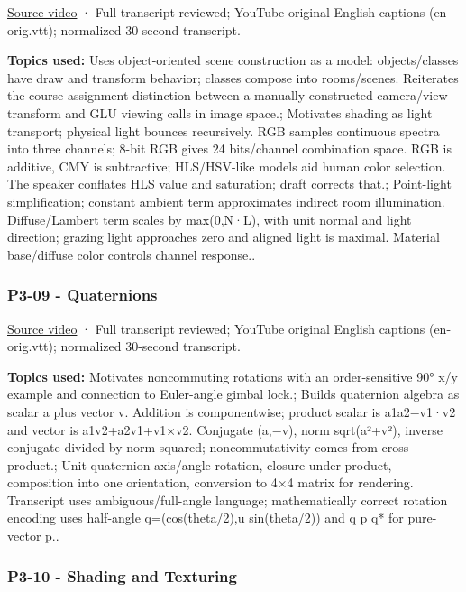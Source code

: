 \href{https://www.youtube.com/watch?v=TEjDYtkLRdQ}{Source video} · Full transcript reviewed; YouTube original English captions (en-orig.vtt); normalized 30-second transcript.

\textbf{Topics used:} Uses object-oriented scene construction as a model: objects/classes have draw and transform behavior; classes compose into rooms/scenes. Reiterates the course assignment distinction between a manually constructed camera/view transform and GLU viewing calls in image space.; Motivates shading as light transport; physical light bounces recursively. RGB samples continuous spectra into three channels; 8-bit RGB gives 24 bits/channel combination space. RGB is additive, CMY is subtractive; HLS/HSV-like models aid human color selection. The speaker conflates HLS value and saturation; draft corrects that.; Point-light simplification; constant ambient term approximates indirect room illumination. Diffuse/Lambert term scales by max(0,N·L), with unit normal and light direction; grazing light approaches zero and aligned light is maximal. Material base/diffuse color controls channel response..

\subsubsection{P3-09 - Quaternions}\label{04-visual-computing-ii-ch036-p3-09---quaternions}

\href{https://www.youtube.com/watch?v=mHVwd8gYLnI}{Source video} · Full transcript reviewed; YouTube original English captions (en-orig.vtt); normalized 30-second transcript.

\textbf{Topics used:} Motivates noncommuting rotations with an order-sensitive 90° x/y example and connection to Euler-angle gimbal lock.; Builds quaternion algebra as scalar a plus vector v. Addition is componentwise; product scalar is a1a2−v1·v2 and vector is a1v2+a2v1+v1×v2. Conjugate (a,−v), norm sqrt(a²+\textbar v\textbar²), inverse conjugate divided by norm squared; noncommutativity comes from cross product.; Unit quaternion axis/angle rotation, closure under product, composition into one orientation, conversion to 4×4 matrix for rendering. Transcript uses ambiguous/full-angle language; mathematically correct rotation encoding uses half-angle q=(cos(theta/2),u sin(theta/2)) and q p q* for pure-vector p..

\subsubsection{P3-10 - Shading and Texturing}\label{04-visual-computing-ii-ch036-p3-10---shading-and-texturing}

